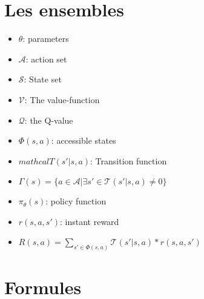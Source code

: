 \documentclass[8pt,a4paper]{extarticle}
\begin{document}
\section*{Les ensembles}

\begin{multicols}{2}

\begin{itemize}

\item
  $\theta$: parameters
\item
  $\mathcal{A}$: action set
\item
  $\mathcal{S}$: State set
\item
  $\mathcal V$: The value-function
\item
  $\mathcal Q$: the Q-value
\item
  $\Phi(s, a)$: accessible states 

\item
  $mathcal T(s' | s, a)$: Transition function
  
\item
  $\Gamma (s) = \{ a \in \mathcal{A} | \exists s' \in \mathcal T (s' | s, a) \neq 0 \}$

\item
  $\pi_{\theta}(s)$: policy function

\item
  $r(s, a, s')$: instant reward

\item
  $R(s, a)= \sum_{s' \in \Phi(s, a)} \mathcal T(s' | s, a)* r(s, a, s')$
 
\end{itemize}

\end{multicols}

\section*{Formules}
\end{document}
